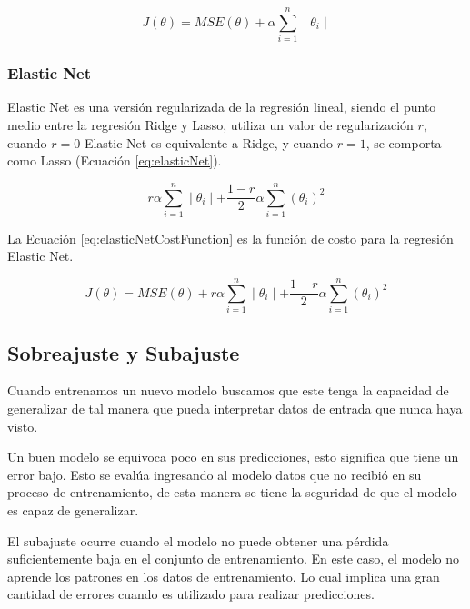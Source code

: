 \begin{equation}
    \label{eq:lassoCostFunction}
    J(\theta) = MSE(\theta)
    + \alpha \displaystyle\sum\limits_{i=1}^n  \mid \theta_i \mid
\end{equation}

\subsubsection{Elastic Net}

Elastic Net es una versión regularizada de la regresión lineal, siendo el punto medio entre la regresión Ridge y Lasso, utiliza un valor de regularización $r$, cuando $r = 0$ Elastic Net es equivalente a Ridge, y cuando $r = 1$, se comporta como Lasso (Ecuación \ref{eq:elasticNet}).

\begin{equation}
    \label{eq:elasticNet}
    r \alpha \displaystyle\sum\limits_{i=1}^n  \mid \theta_i \mid
    + \frac{1 - r}{2} \alpha \displaystyle\sum\limits_{i=1}^n  (\theta_i)^{2}
\end{equation}

La Ecuación \ref{eq:elasticNetCostFunction} es la función de costo para la regresión Elastic Net.

\begin{equation}
    \label{eq:elasticNetCostFunction}
    J(\theta) = MSE(\theta)
    + r \alpha \displaystyle\sum\limits_{i=1}^n  \mid \theta_i \mid
    + \frac{1 - r}{2} \alpha \displaystyle\sum\limits_{i=1}^n  (\theta_i)^{2}
\end{equation}

\subsection{Sobreajuste y Subajuste}

Cuando entrenamos un nuevo modelo buscamos que este tenga la capacidad de generalizar de tal manera que pueda interpretar datos de entrada que nunca haya visto.

Un buen modelo se equivoca poco en sus predicciones, esto significa que tiene un error bajo. Esto se evalúa ingresando al modelo datos que no recibió en su proceso de entrenamiento, de esta manera se tiene la seguridad de que el modelo es capaz de generalizar.

El subajuste ocurre cuando el modelo no puede obtener una pérdida suficientemente baja en el conjunto de entrenamiento. En este caso, el modelo no aprende los patrones en los datos de entrenamiento. Lo cual implica una gran cantidad de errores cuando es utilizado para realizar predicciones.


